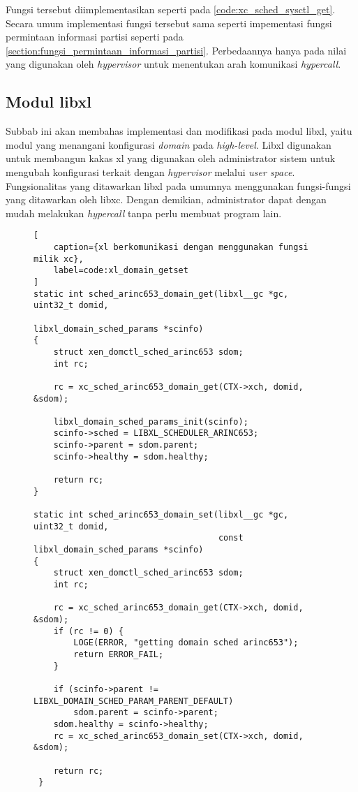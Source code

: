 Fungsi tersebut diimplementasikan seperti pada \autoref{code:xc_sched_sysctl_get}. Secara umum
implementasi fungsi tersebut sama seperti impementasi fungsi permintaan informasi partisi
seperti pada \autoref{section:fungsi_permintaan_informasi_partisi}. Perbedaannya hanya pada
nilai yang digunakan oleh \textit{hypervisor} untuk menentukan arah komunikasi
\textit{hypercall}.

\subsection{Modul libxl}
\label{section:modul_libxl}

Subbab ini akan membahas implementasi dan modifikasi pada modul libxl, yaitu modul yang
menangani konfigurasi \textit{domain} pada \textit{high-level}. Libxl digunakan untuk membangun
kakas xl yang digunakan oleh administrator sistem untuk mengubah konfigurasi terkait dengan
\textit{hypervisor} melalui \textit{user space}. Fungsionalitas yang ditawarkan libxl pada
umumnya menggunakan fungsi-fungsi yang ditawarkan oleh libxc. Dengan demikian, administrator
dapat dengan mudah melakukan \textit{hypercall} tanpa perlu membuat program lain.

\begin{figure}[!h]
\begin{lstlisting}[
	caption={xl berkomunikasi dengan menggunakan fungsi milik xc},
	label=code:xl_domain_getset
]
static int sched_arinc653_domain_get(libxl__gc *gc, uint32_t domid,
                                   libxl_domain_sched_params *scinfo)
{
    struct xen_domctl_sched_arinc653 sdom;
    int rc;

    rc = xc_sched_arinc653_domain_get(CTX->xch, domid, &sdom);

    libxl_domain_sched_params_init(scinfo);
    scinfo->sched = LIBXL_SCHEDULER_ARINC653;
    scinfo->parent = sdom.parent;
    scinfo->healthy = sdom.healthy;

    return rc;
}

static int sched_arinc653_domain_set(libxl__gc *gc, uint32_t domid,
                                     const libxl_domain_sched_params *scinfo)
{
    struct xen_domctl_sched_arinc653 sdom;
    int rc;

    rc = xc_sched_arinc653_domain_get(CTX->xch, domid, &sdom);
    if (rc != 0) {
        LOGE(ERROR, "getting domain sched arinc653");
        return ERROR_FAIL;
    }

    if (scinfo->parent != LIBXL_DOMAIN_SCHED_PARAM_PARENT_DEFAULT)
        sdom.parent = scinfo->parent;
    sdom.healthy = scinfo->healthy;
    rc = xc_sched_arinc653_domain_set(CTX->xch, domid, &sdom);

    return rc;
 }
\end{lstlisting}
\end{figure}

